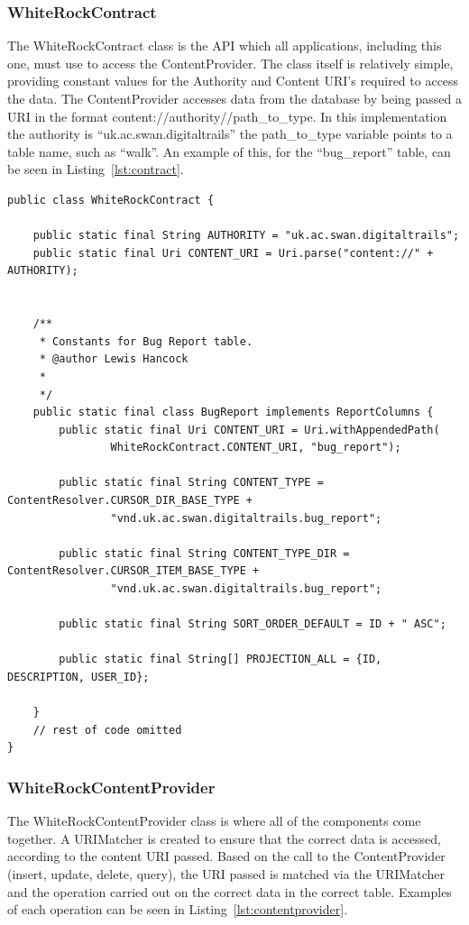 \documentclass[11pt,a4paper]{article}
\begin{document}
\subsubsection{WhiteRockContract}
The WhiteRockContract class is the API which all applications, including this one, must use to access the ContentProvider. The class itself is relatively simple, providing constant values for the Authority and Content URI's required to access the data. The ContentProvider accesses data from the database by being passed a URI in the format content://authority//path\_to\_type. In this implementation the authority is ``uk.ac.swan.digitaltrails'' the path\_to\_type variable points to a table name, such as ``walk''. An example of this, for the ``bug\_report'' table, can be seen in Listing~\ref{lst:contract}.

\begin{lstlisting}[captionpos=b, caption=WhiteRockContract Snippet, label=lst:contract, frame=single]
public class WhiteRockContract {
	
	public static final String AUTHORITY = "uk.ac.swan.digitaltrails";
	public static final Uri CONTENT_URI = Uri.parse("content://" + AUTHORITY);


	/**
	 * Constants for Bug Report table.
	 * @author Lewis Hancock
	 *
	 */
	public static final class BugReport implements ReportColumns {
		public static final Uri CONTENT_URI = Uri.withAppendedPath(
				WhiteRockContract.CONTENT_URI, "bug_report");
	
		public static final String CONTENT_TYPE = ContentResolver.CURSOR_DIR_BASE_TYPE +
				"vnd.uk.ac.swan.digitaltrails.bug_report";
		
		public static final String CONTENT_TYPE_DIR = ContentResolver.CURSOR_ITEM_BASE_TYPE +
				"vnd.uk.ac.swan.digitaltrails.bug_report";
		
		public static final String SORT_ORDER_DEFAULT = ID + " ASC";
		
		public static final String[] PROJECTION_ALL = {ID, DESCRIPTION, USER_ID};

	}
	// rest of code omitted
}
\end{lstlisting}


\subsubsection{WhiteRockContentProvider}
The WhiteRockContentProvider class is where all of the components come together. A URIMatcher is created to ensure that the correct data is accessed, according to the content URI passed. Based on the call to the ContentProvider (insert, update, delete, query), the URI passed is matched via the URIMatcher and the operation carried out on the correct data in the correct table. Examples of each operation can be seen in Listing~\ref{lst:contentprovider}.
\end{document}
